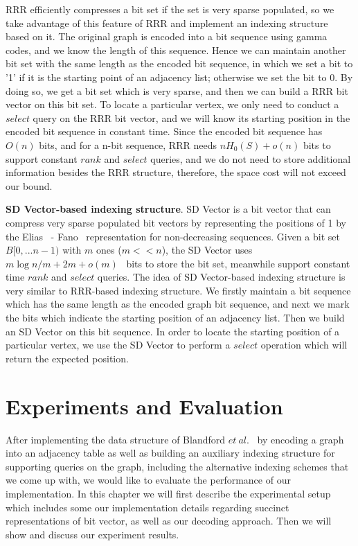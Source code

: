 \documentclass[12pt,glossary]{dalthesis}
\begin{document}
\bigskip
\bigskip

RRR efficiently compresses a bit set if the set is very sparse populated, so we take advantage of this feature of RRR and implement an indexing structure based on it. The original graph is encoded into a bit sequence using gamma codes, and we know the length of this sequence. Hence we can maintain another bit set with the same length as the encoded bit sequence, in which we set a bit to '1' if it is the starting point of an adjacency list; otherwise we set the bit to 0. By doing so, we get a bit set which is very sparse, and then we can build a RRR bit vector on this bit set. To locate a particular vertex, we only need to conduct a $select$ query on the RRR bit vector, and we will know its starting position in the encoded bit sequence in constant time. Since the encoded bit sequence has $O(n)$ bits, and for a n-bit sequence, RRR needs $nH_{0}(S)+o(n)$ bits to support constant $rank$ and $select$ queries, and we do not need to store additional information besides the RRR structure, therefore, the space cost will not exceed our bound. 

\bigskip
\bigskip

\textbf{SD Vector-based indexing structure}. SD Vector is a bit vector that can compress very sparse populated bit vectors by representing the positions of 1 by the Elias~\cite{Elias} - Fano~\cite{Fano} representation for non-decreasing sequences. Given a bit set $B[0,...n-1)$ with $m$ ones ($m << n$),   the SD Vector uses $m \log n/m  + 2m + o(m)$~\cite{Practical-Entropy} bits to store the bit set, meanwhile support constant time $rank$ and $select$ queries. The idea of SD Vector-based indexing structure is very similar to RRR-based indexing structure. We firstly maintain a bit sequence which has the same length as the encoded graph bit sequence, and next we mark the bits which indicate the starting position of an adjacency list. Then we build an SD Vector on this bit sequence. In order to locate the starting position of a particular vertex, we use the SD Vector to perform a $select$ operation which will return the expected position. 


\chapter{Experiments and Evaluation}
After implementing the data structure of Blandford $et \ al.$~\cite{compact-representation} by encoding a graph into an adjacency table as well as building an auxiliary indexing structure for supporting queries on the graph, including the alternative indexing schemes that we come up with, we would like to evaluate the performance of our implementation. In this chapter we will first describe the experimental setup which includes some our implementation details regarding succinct representations of bit vector, as well as our decoding approach. Then we will show and discuss our experiment results.
\end{document}
